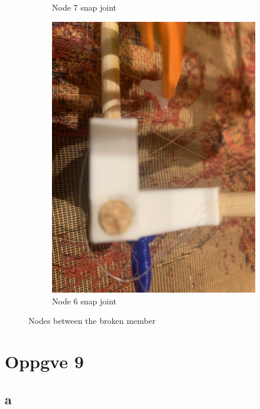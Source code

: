 \documentclass{report}
\newcommand{\subimgw}{.7\linewidth}
\begin{document}
\begin{figure}[H]
\begin{subfigure}{.5\textwidth}
		\caption{Node 7 snap joint}
		\label{fig:snap:7}
	\end{subfigure}%
	\begin{subfigure}{.5\textwidth}
		\centering
		\includegraphics[width=\subimgw,trim={0 5cm 0 40cm},clip]{beam-7}

		\caption{Node 6 snap joint}
		\label{fig:snap:6}
	\end{subfigure}

	\caption{Nodes between the broken member}
	\label{fig:snap}
\end{figure}

\section{Oppgve 9}

\subsection{a}
\end{document}
